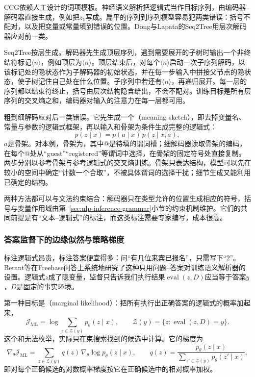 CCG依赖人工设计的词项模板。神经语义解析把逻辑式当作目标序列，由编码器--解码器直接生成，例如把$z_1$写成。扁平的序列到序列模型容易犯两类错误：括号不配对，以及把变量或常量填到错误的位置。Dong与Lapata的Seq2Tree用层次解码器应对前一类。

Seq2Tree按层生成。解码器先生成顶层序列，遇到需要展开的子树时输出一个非终结符标记$\langle n\rangle$，例如顶层为$\langle n\rangle$\code{)}。顶层结束后，对每个$\langle n\rangle$启动一次子序列解码，以该标记处的隐状态作为子解码器的初始状态，并在每一步输入中拼接父节点的隐状态，使子树记住自己处在什么位置。子序列中若还有$\langle n\rangle$，再递归展开。每一层的序列都以结束符终止，括号由层次结构隐含给出，不会不配对。训练目标是所有层序列的交叉熵之和，编码器对输入的注意力在每一层都可用。

粗到细解码应对后一类错误。它先生成一个（meaning sketch），即去掉变量名、常量与参数的逻辑式框架，再以输入和骨架为条件生成完整的逻辑式：
\[
 p(z\mid x)=p(a\mid x)\,p(z\mid x,a),
\]
$a$是骨架。对本例，骨架为，其中@是待填的谓词槽；细解码器读取骨架的编码，在每个@处从“guest”“registered”等谓词中选择，在骨架的固定符号处直接复制。两步分别以参考骨架与参考逻辑式的交叉熵训练。骨架只表达结构，模型可以先在较小的空间中确定“计数一个合取”，不被具体谓词的选择干扰；细节生成又能利用已确定的结构。

两种方法都可以与文法约束结合：解码器只在类型允许的位置生成相应的符号，括号与变量作用域由第~\ref{sec:nlp-inference-grammar}小节的约束机制维护。它们的共同前提是有“文本--逻辑式”的标注，而这类标注需要专家编写，成本很高。

\subsubsection{答案监督下的边缘似然与策略梯度}
\label{sec:nlp-analysis-answer-supervision}

标注逻辑式昂贵，标注答案便宜得多：问“有几位来宾已报名”，只需写下“2”。Berant等在Freebase问答上系统地研究了这种只用问题--答案对训练语义解析器的设置。逻辑式$z$成了隐变量，监督只告诉我们执行结果$\operatorname{eval}(z,D)$应当等于答案$y$，$D$是固定的事实环境。

第一种目标是（marginal likelihood）：把所有执行出正确答案的逻辑式的概率加起来，
\begin{equation}
 \mathcal J_{\mathrm{ML}}=\log\sum_{z\in\mathcal Z(y)}p_\theta(z\mid x),\qquad
 \mathcal Z(y)=\{z:\operatorname{eval}(z,D)=y\}.
 \label{eq:nlp-analysis-marginal-likelihood}
\end{equation}
这个和无法枚举，实际只在束搜索找到的候选中计算。它的梯度为
\[
 \nabla_\theta\mathcal J_{\mathrm{ML}}=\sum_{z\in\mathcal Z(y)}q(z)\,\nabla_\theta\log p_\theta(z\mid x),\qquad
 q(z)=\frac{p_\theta(z\mid x)}{\sum_{z'\in\mathcal Z(y)}p_\theta(z'\mid x)},
\]
即对每个正确候选的对数概率梯度按它在正确候选中的相对概率加权。

